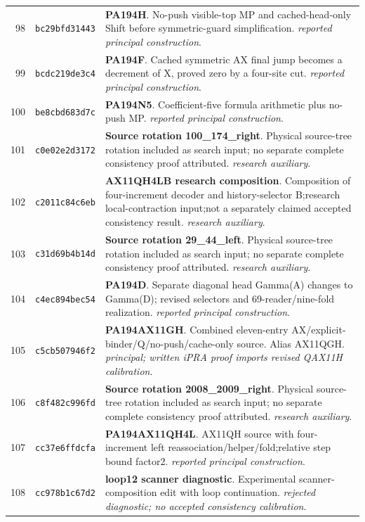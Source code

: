 \begin{longtable}{@{}r p{} p{}@{}}
98 & \texttt{bc29bfd31443} & \textbf{PA194H}. No-push visible-top MP and cached-head-only Shift before symmetric-guard simplification. \emph{reported principal construction}.\\[3pt]
99 & \texttt{bcdc219de3c4} & \textbf{PA194F}. Cached symmetric AX final jump becomes a decrement of X, proved zero by a four-site cut. \emph{reported principal construction}.\\[3pt]
100 & \texttt{be8cbd683d7c} & \textbf{PA194N5}. Coefficient-five formula arithmetic plus no-push MP. \emph{reported principal construction}.\\[3pt]
101 & \texttt{c0e02e2d3172} & \textbf{Source rotation 100\_174\_right}. Physical source-tree rotation included as search input; no separate complete consistency proof attributed. \emph{research auxiliary}.\\[3pt]
102 & \texttt{c2011c84c6eb} & \textbf{AX11QH4LB research composition}. Composition of four-increment decoder and history-selector B;research local-contraction input;not a separately claimed accepted consistency result. \emph{research auxiliary}.\\[3pt]
103 & \texttt{c31d69b4b14d} & \textbf{Source rotation 29\_44\_left}. Physical source-tree rotation included as search input; no separate complete consistency proof attributed. \emph{research auxiliary}.\\[3pt]
104 & \texttt{c4ec894bec54} & \textbf{PA194D}. Separate diagonal head Gamma(A) changes to Gamma(D); revised selectors and 69-reader/nine-fold realization. \emph{reported principal construction}.\\[3pt]
105 & \texttt{c5cb507946f2} & \textbf{PA194AX11GH}. Combined eleven-entry AX/explicit-binder/Q/no-push/cache-only source. Alias AX11QGH. \emph{principal; written iPRA proof imports revised QAX11H calibration}.\\[3pt]
106 & \texttt{c8f482c996fd} & \textbf{Source rotation 2008\_2009\_right}. Physical source-tree rotation included as search input; no separate complete consistency proof attributed. \emph{research auxiliary}.\\[3pt]
107 & \texttt{cc37e6ffdcfa} & \textbf{PA194AX11QH4L}. AX11QH source with four-increment left reassociation/helper/fold;relative step bound factor2. \emph{reported principal construction}.\\[3pt]
108 & \texttt{cc978b1c67d2} & \textbf{loop12 scanner diagnostic}. Experimental scanner-composition edit with loop continuation. \emph{rejected diagnostic; no accepted consistency calibration}.\\[3pt]

\end{longtable}
